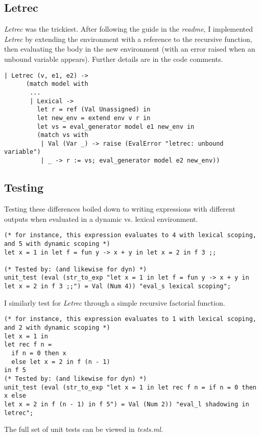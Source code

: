 \documentclass[12pt]{article}
\begin{document}
\subsection*{Letrec}
\textit{Letrec} was the trickiest. After following the guide in the \textit{readme}, I implemented \textit{Letrec} by extending the environment with a reference to the recursive function, then evaluating the body in the new environment (with an error raised when an unbound variable appears). Further details are in the code comments.
\begin{verbatim}
| Letrec (v, e1, e2) ->
      (match model with
       ...
       | Lexical ->
         let r = ref (Val Unassigned) in
         let new_env = extend env v r in
         let vs = eval_generator model e1 new_env in
         (match vs with
          | Val (Var _) -> raise (EvalError "letrec: unbound variable")
          | _ -> r := vs; eval_generator model e2 new_env))
\end{verbatim}

\subsection*{Testing}
Testing these differences boiled down to writing expressions with different outputs when evaluated in a dynamic vs. lexical environment.
\begin{verbatim}
(* for instance, this expression evaluates to 4 with lexical scoping, 
and 5 with dynamic scoping *)
let x = 1 in let f = fun y -> x + y in let x = 2 in f 3 ;;

(* Tested by: (and likewise for dyn) *)
unit_test (eval (str_to_exp "let x = 1 in let f = fun y -> x + y in 
let x = 2 in f 3 ;;") = Val (Num 4)) "eval_s lexical scoping";
\end{verbatim}
I similarly test for \textit{Letrec} through a simple recursive factorial function. 

\begin{verbatim}
(* for instance, this expression evaluates to 1 with lexical scoping, 
and 2 with dynamic scoping *)
let x = 1 in
let rec f n =
  if n = 0 then x
  else let x = 2 in f (n - 1)
in f 5
(* Tested by: (and likewise for dyn) *)
unit_test (eval (str_to_exp "let x = 1 in let rec f n = if n = 0 then x else 
let x = 2 in f (n - 1) in f 5") = Val (Num 2)) "eval_l shadowing in letrec";
\end{verbatim}

The full set of unit tests can be viewed in \textit{tests.ml}.
\end{document}
